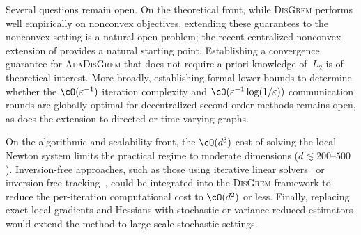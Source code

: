 \documentclass[review,onefignum,onetabnum]{siamart171218}
\begin{document}
	Several questions remain open.
	On the theoretical front, while \textsc{DisGrem} performs well empirically
	on nonconvex objectives, extending these guarantees to the nonconvex setting is a natural open problem;
	the recent centralized nonconvex extension of \citet{gratton2023nonconvex} provides
	a natural starting point. Establishing a convergence guarantee for
	\textsc{AdaDisGrem} that does not require a priori knowledge of~$L_2$
	is of theoretical interest. More broadly, establishing formal lower bounds to determine whether
	the $\cO(\varepsilon^{-1})$ iteration complexity and
	$\cO(\varepsilon^{-1}\log(1/\varepsilon))$ communication rounds are globally
	optimal for decentralized second-order methods remains open, as does the
	extension to directed or time-varying graphs.
	
	On the algorithmic and scalability front, the $\cO(d^3)$ cost of solving the
	local Newton system limits the practical regime to moderate dimensions
	($d\lesssim 200$--$500$). Inversion-free approaches, such as those using
	iterative linear solvers~\citep{jakovetic2025dinas} or inversion-free tracking~\citep{yuan2023indo},
	could be integrated into the \textsc{DisGrem} framework to reduce
	the per-iteration computational cost to $\cO(d^2)$ or less. Finally, replacing
	exact local gradients and Hessians with stochastic or variance-reduced estimators
	would extend the method to large-scale stochastic settings.
	
	
\end{document}
